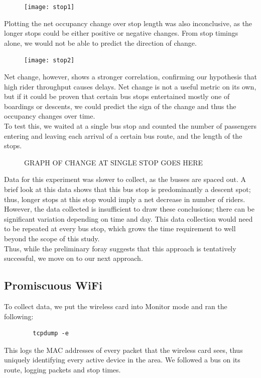 \documentclass[letterpaper]{scrartcl}
\begin{document}
	\begin{figure}[H]
	\texttt{[image: stop1]}
	\centering
	\end{figure}

	Plotting the net occupancy change over stop length was also inconclusive, as the longer stops could be either positive or negative changes.
	From stop timings alone, we would not be able to predict the direction of change.

	\begin{figure}[H]
	\texttt{[image: stop2]}
	\centering
	\end{figure}

	Net change, however, shows a stronger correlation, confirming our hypothesis that high rider throughput causes delays.
	Net change is not a useful metric on its own, but if it could be proven that certain bus stops entertained mostly one of boardings or descents, we could predict the sign of the change and thus the occupancy changes over time.
	\\
	To test this, we waited at a single bus stop and counted the number of passengers entering and leaving each arrival of a certain bus route, and the length of the stops.

	\begin{figure}[H]
	GRAPH OF CHANGE AT SINGLE STOP GOES HERE
	\centering
	\end{figure}

	Data for this experiment was slower to collect, as the busses are spaced out. A brief look at this data shows that this bus stop is predominantly a descent spot; thus, longer stops at this stop would imply a net decrease in number of riders.
	\\
	However, the data collected is insufficient to draw these conclusions; there can be significant variation depending on time and day.
	This data collection would need to be repeated at every bus stop, which grows the time requirement to well beyond the scope of this study.
	\\
	Thus, while the preliminary foray suggests that this approach is tentatively successful, we move on to our next approach.
	
\subsection*{Promiscuous WiFi}
	To collect data, we put the wireless card into Monitor mode and ran the following:
	\begin{verbatim}
		tcpdump -e
	\end{verbatim}
	This logs the MAC addresses of every packet that the wireless card sees, thus uniquely identifying every active device in the area.
	We followed a bus on its route, logging packets and stop times.
\end{document}
